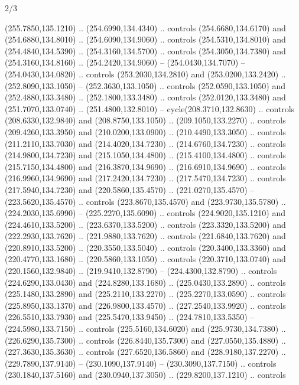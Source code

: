 \begin{flagdescription}{2/3}
\begin{scope}[xshift=0.5\flaglength,yshift=0.5\flagwidth,scale=\flagwidth/259.2]
\begin{scope}[y=0.8pt, x=0.8pt, yscale=-1,shift={(-243,-162)}]
      (255.7850,135.1210) .. (254.6990,134.4340) .. controls (254.6680,134.6170) and
      (254.6880,134.8010) .. (254.6090,134.9060) .. controls (254.5310,134.8010) and
      (254.4840,134.5390) .. (254.3160,134.5700) .. controls (254.3050,134.7380) and
      (254.3160,134.8160) .. (254.2420,134.9060) -- (254.0430,134.7070) --
      (254.0430,134.0820) .. controls (253.2030,134.2810) and (253.0200,133.2420) ..
      (252.8090,133.1050) -- (252.3630,133.1050) .. controls (252.0590,133.1050) and
      (252.4880,133.3480) .. (252.1800,133.3480) .. controls (252.0120,133.3480) and
      (251.7070,133.0740) .. (251.4800,132.8010) -- cycle(208.3710,132.8630) ..
      controls (208.6330,132.9840) and (208.8750,133.1050) .. (209.1050,133.2270) ..
      controls (209.4260,133.3950) and (210.0200,133.0900) .. (210.4490,133.3050) ..
      controls (211.2110,133.7030) and (214.4020,134.7230) .. (214.6760,134.7230) ..
      controls (214.9800,134.7230) and (215.1050,134.4800) .. (215.4100,134.4800) ..
      controls (215.7150,134.4800) and (216.3870,134.9690) .. (216.6910,134.9690) ..
      controls (216.9960,134.9690) and (217.2420,134.7230) .. (217.5470,134.7230) ..
      controls (217.5940,134.7230) and (220.5860,135.4570) .. (221.0270,135.4570) --
      (223.5620,135.4570) .. controls (223.8670,135.4570) and (223.9730,135.5780) ..
      (224.2030,135.6990) -- (225.2270,135.6090) .. controls (224.9020,135.1210) and
      (224.4610,133.5200) .. (223.6370,133.5200) .. controls (223.3320,133.5200) and
      (222.2930,133.7620) .. (221.9880,133.7620) .. controls (221.6840,133.7620) and
      (220.8910,133.5200) .. (220.3550,133.5040) .. controls (220.3400,133.3360) and
      (220.4770,133.1680) .. (220.5860,133.1050) .. controls (220.3710,133.0740) and
      (220.1560,132.9840) .. (219.9410,132.8790) -- (224.4300,132.8790) .. controls
      (224.6290,133.0430) and (224.8280,133.1680) .. (225.0430,133.2890) .. controls
      (225.1480,133.2890) and (225.2110,133.2270) .. (225.2270,133.0590) .. controls
      (225.8950,133.1370) and (226.9800,133.4570) .. (227.2540,133.9920) .. controls
      (226.5510,133.7930) and (225.5470,133.9450) .. (224.7810,133.5350) --
      (224.5980,133.7150) .. controls (225.5160,134.6020) and (225.9730,134.7380) ..
      (226.6290,135.7300) .. controls (226.8440,135.7300) and (227.0550,135.4880) ..
      (227.3630,135.3630) .. controls (227.6520,136.5860) and (228.9180,137.2270) ..
      (229.7890,137.9140) -- (230.1090,137.9140) -- (230.3090,137.7150) .. controls
      (230.1840,137.5160) and (230.0940,137.3050) .. (229.8200,137.1210) .. controls

\end{scope}
\end{scope}
\end{flagdescription}
